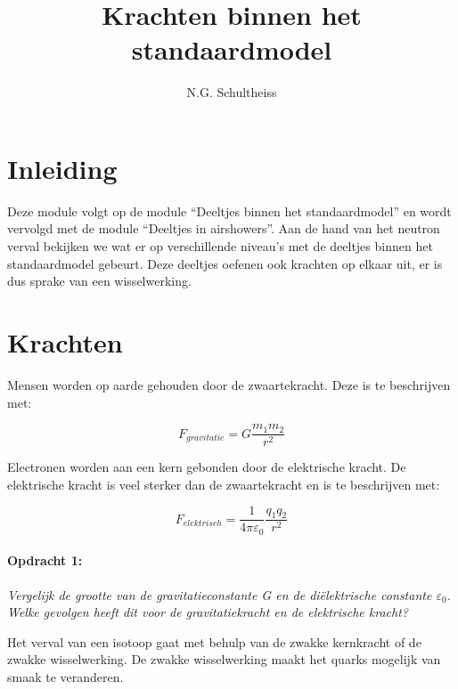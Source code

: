 



\title{Krachten binnen het standaardmodel}
\author{N.G. Schultheiss}
\date{}

\maketitle
\thispagestyle{firststyle}

\section{Inleiding}

Deze module volgt op de module ``Deeltjes binnen het standaardmodel''
en wordt vervolgd met de module ``Deeltjes in airshowers''. Aan
de hand van het neutron verval bekijken we wat er op verschillende
niveau's met de deeltjes binnen het standaardmodel gebeurt. Deze deeltjes
oefenen ook krachten op elkaar uit, er is dus sprake van een wisselwerking.


\section{Krachten}

Mensen worden op aarde gehouden door de zwaartekracht. Deze is te
beschrijven met:

\begin{equation}
F_{gravitatie}=G\frac{m_{1}m_{2}}{r^{2}}
\end{equation}


Electronen worden aan een kern gebonden door de elektrische kracht.
De elektrische kracht is veel sterker dan de zwaartekracht en is te
beschrijven met:

\begin{equation}
F_{elektrisch}=\frac{1}{4\pi\varepsilon_{0}}\frac{q_{1}q_{2}}{r^{2}}
\end{equation}



\paragraph*{Opdracht 1:}

\emph{Vergelijk de grootte van de gravitatieconstante G en de diëlektrische
constante $\varepsilon_{0}$. Welke gevolgen heeft dit voor de gravitatiekracht
en de elektrische kracht?}

Het verval van een isotoop gaat met behulp van de zwakke kernkracht
of de zwakke wisselwerking. De zwakke wisselwerking maakt het quarks
mogelijk van smaak te veranderen.

